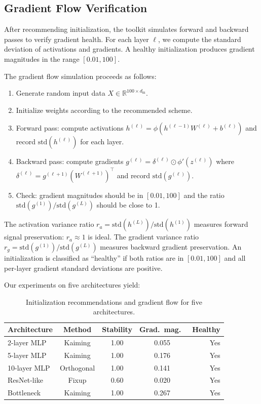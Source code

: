 \documentclass[10pt]{article}
\theoremstyle{definition}
\begin{document}
\subsection{Gradient Flow Verification}

After recommending initialization, the toolkit simulates forward and backward passes to verify gradient health.
For each layer $\ell$, we compute the standard deviation of activations and gradients.
A healthy initialization produces gradient magnitudes in the range $[0.01, 100]$.

The gradient flow simulation proceeds as follows:
\begin{enumerate}[nosep]
  \item Generate random input data $X \in \mathbb{R}^{100 \times d_{\text{in}}}$.
  \item Initialize weights according to the recommended scheme.
  \item Forward pass: compute activations $h^{(\ell)} = \phi(h^{(\ell-1)} W^{(\ell)} + b^{(\ell)})$ and record $\text{std}(h^{(\ell)})$ for each layer.
  \item Backward pass: compute gradients $g^{(\ell)} = \delta^{(\ell)} \odot \phi'(z^{(\ell)})$ where $\delta^{(\ell)} = g^{(\ell+1)} (W^{(\ell+1)})^\top$ and record $\text{std}(g^{(\ell)})$.
  \item Check: gradient magnitudes should be in $[0.01, 100]$ and the ratio $\text{std}(g^{(1)})/\text{std}(g^{(L)})$ should be close to 1.
\end{enumerate}

The activation variance ratio $r_a = \text{std}(h^{(L)})/\text{std}(h^{(1)})$ measures forward signal preservation: $r_a \approx 1$ is ideal.
The gradient variance ratio $r_g = \text{std}(g^{(1)})/\text{std}(g^{(L)})$ measures backward gradient preservation.
An initialization is classified as ``healthy'' if both ratios are in $[0.01, 100]$ and all per-layer gradient standard deviations are positive.

Our experiments on five architectures yield:
\begin{table}[htbp]
\centering
\caption{Initialization recommendations and gradient flow for five architectures.}
\label{tab:init}
\begin{tabular}{lcccr}
\toprule
Architecture & Method & Stability & Grad.\ mag.\ & Healthy \\
\midrule
2-layer MLP   & Kaiming    & 1.00 & 0.055 & Yes \\
5-layer MLP   & Kaiming    & 1.00 & 0.176 & Yes \\
10-layer MLP  & Orthogonal & 1.00 & 0.141 & Yes \\
ResNet-like   & Fixup      & 0.60 & 0.020 & Yes \\
Bottleneck    & Kaiming    & 1.00 & 0.267 & Yes \\
\bottomrule
\end{tabular}
\end{table}
\end{document}

